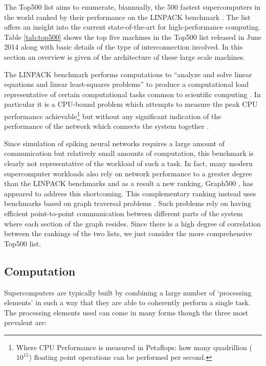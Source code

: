 		The Top500 list \cite{meuer14j} aims to enumerate, biannually, the 500
		fastest supercomputers in the world ranked by their performance on the
		LINPACK benchmark \cite{dongarraLINPAC}. The list offers an insight into the
		current state-of-the-art for high-performance computing. Table
		\ref{tab:top500} shows the top five machines in the Top500 list released in
		June 2014 along with basic details of the type of interconnection involved.
		In this section an overview is given of the architecture of these large
		scale machines.
		
		The LINPACK benchmark performs computations to ``analyze and solve linear
		equations and linear least-squares problems'' to produce a computational
		load representative of certain computational tasks common to scientific
		computing \cite{dongarra84}. In particular it is a CPU-bound problem which
		attempts to measure the peak CPU performance achievable\footnote{Where CPU
		Performance is measured in Petaflops: how many quadrillion ($10^{15}$)
		floating point operations can be performed per second.} but without any
		significant indication of the performance of the network which connects the
		system together \cite{dongarra07}.
		
		Since simulation of spiking neural networks requires a large amount of
		communication but relatively small amounts of computation, this benchmark is
		clearly not representative of the workload of such a task.  In fact, many
		modern supercomputer workloads also rely on network performance to a
		greater degree than the LINPACK benchmarks and as a result a new ranking,
		Graph500 \cite{murphy13n}, has appeared to address this shortcoming. This
		complementary ranking instead uses benchmarks based on graph traversal
		problems \cite{murphy10}. Such problems rely on having efficient
		point-to-point communication between different parts of the system where
		each section of the graph resides. Since there is a high degree of
		correlation between the rankings of the two lists, we just consider the more
		comprehensive Top500 list.
		
		
		\subsection{Computation}
			
			Supercomputers are typically built by combining a large number of
			`processing elements' in such a way that they are able to coherently
			perform a single task. The processing elements used can come in many forms
			though the three most prevalent are:
			
